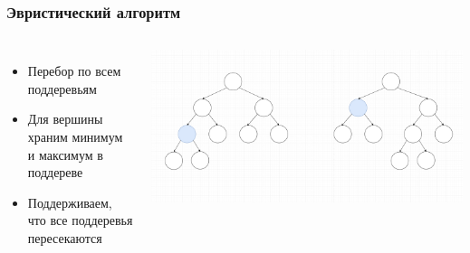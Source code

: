 \documentclass{beamer}
\begin{document}
\begin{frame} \frametitle{Эвристический алгоритм}
    \begin{columns}
            \begin{itemize}
                \item Перебор по всем поддеревьям
                \item Для вершины храним минимум и максимум в поддереве
                \item Поддерживаем, что все поддеревья пересекаются
            \end{itemize}
            \includegraphics[width=\textwidth]{tree.png}
    \end{columns}
\end{frame}
\end{document}
